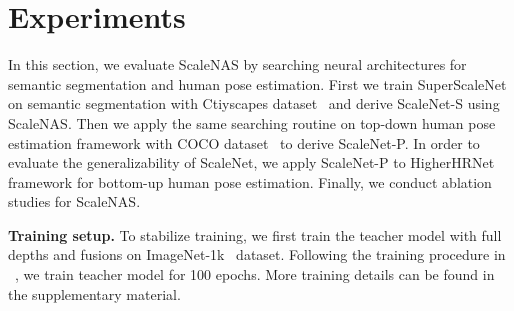 \documentclass[final]{cvpr}
\newcommand{\workname}{ScaleNAS\xspace}
\newcommand{\netname}{ScaleNet\xspace}
\newcommand{\supernet}{SuperScaleNet\xspace}
\begin{document}
 \section{Experiments} \label{sec:experiment}

In this section, we evaluate \workname by searching neural architectures for semantic segmentation and human pose estimation. First we train \supernet on semantic segmentation with Ctiyscapes dataset~\cite{cordts2016cityscapes} and derive \netname-S using \workname. Then we apply the same searching routine on top-down human pose estimation framework with COCO dataset~\cite{lin2014microsoft} to derive \netname-P. 
In order to evaluate the generalizability of \netname, we apply \netname-P to HigherHRNet framework for bottom-up human pose estimation.
Finally, we conduct ablation studies for \workname.


\noindent\textbf{Training setup.}
To stabilize training, we first train the teacher model with full depths and fusions on ImageNet-1k~\cite{deng2009imagenet} dataset. Following the training procedure in ~\cite{wang2020deep}, we train teacher model for 100 epochs. More training details can be found in the supplementary material.
\end{document}
